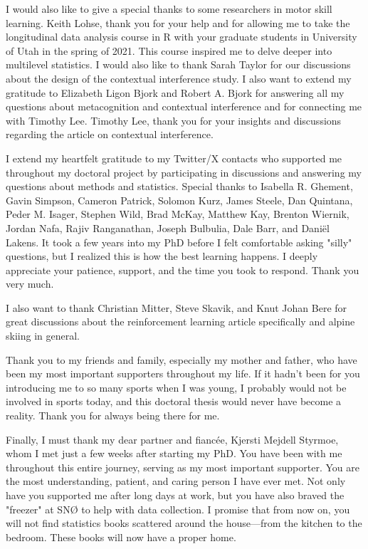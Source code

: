 I would also like to give a special thanks to some researchers in motor skill learning. Keith Lohse, thank you for your help and for allowing me to take the longitudinal data analysis course in R with your graduate students in University of Utah in the spring of 2021. This course inspired me to delve deeper into multilevel statistics. I would also like to thank Sarah Taylor for our discussions about the design of the contextual interference study. I also want to extend my gratitude to Elizabeth Ligon Bjork and Robert A. Bjork for answering all my questions about metacognition and contextual interference and for connecting me with Timothy Lee. Timothy Lee, thank you for your insights and discussions regarding the article on contextual interference.

I extend my heartfelt gratitude to my Twitter/X contacts who supported me throughout my doctoral project by participating in discussions and answering my questions about methods and statistics. Special thanks to Isabella R. Ghement, Gavin Simpson, Cameron Patrick, Solomon Kurz, James Steele, Dan Quintana, Peder M. Isager, Stephen Wild, Brad McKay, Matthew Kay, Brenton Wiernik, Jordan Nafa, Rajiv Ranganathan, Joseph Bulbulia, Dale Barr, and Daniël Lakens. It took a few years into my PhD before I felt comfortable asking "silly" questions, but I realized this is how the best learning happens. I deeply appreciate your patience, support, and the time you took to respond. Thank you very much.

I also want to thank Christian Mitter, Steve Skavik, and Knut Johan Bere for great discussions about the reinforcement learning article specifically and alpine skiing in general.

Thank you to my friends and family, especially my mother and father, who have been my most important supporters throughout my life. If it hadn't been for you introducing me to so many sports when I was young, I probably would not be involved in sports today, and this doctoral thesis would never have become a reality. Thank you for always being there for me.

Finally, I must thank my dear partner and fiancée, Kjersti Mejdell Styrmoe, whom I met just a few weeks after starting my PhD. You have been with me throughout this entire journey, serving as my most important supporter. You are the most understanding, patient, and caring person I have ever met. Not only have you supported me after long days at work, but you have also braved the "freezer" at SNØ to help with data collection. I promise that from now on, you will not find statistics books scattered around the house—from the kitchen to the bedroom. These books will now have a proper home.



\setlength{\parindent}{15pt} %
\setlength{\parskip}{0pt}    %